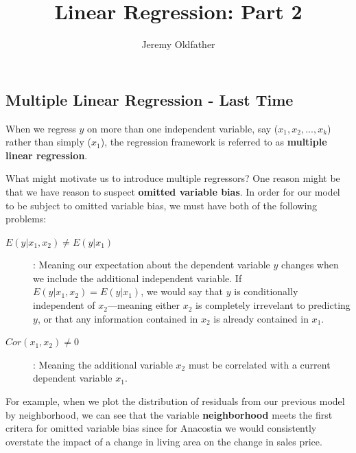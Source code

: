 \documentclass[10pt]{article}\usepackage[]{graphicx}\usepackage[]{color}
\begin{document}
\title{Linear Regression: Part 2}
\author{Jeremy Oldfather}
\maketitle







\subsection*{Multiple Linear Regression - Last Time }

When we regress $y$ on more than one independent variable, say ($x_1, x_2,...,x_k$) rather than simply ($x_1$), the regression framework is referred to as {\bf multiple linear regression}.

What might motivate us to introduce multiple regressors? One reason might be that we have reason to suspect {\bf omitted variable bias}. In order for our model to be subject to omitted variable bias, we must have both of the following problems:

\begin{description}
  \item [$E(y|x_1,x_2) \ne E(y|x_1) $] :  Meaning our expectation about the dependent variable $y$ changes when we include the additional independent variable. If $E(y|x_1,x_2) = E(y|x_1)$, we would say that $y$ is conditionally independent of $x_2$---meaning either $x_2$ is completely irrevelant to predicting $y$, or that any information contained in $x_2$ is already contained in $x_1$.
  \item [$Cor(x_1, x_2) \ne 0 $] :  Meaning the additional variable $x_2$ must be correlated with a current dependent variable $x_1$.
\end{description}

For example, when we plot the distribution of residuals from our previous model by neighborhood, we can see that the variable {\bf neighborhood} meets the first critera for omitted variable bias since for Anacostia we would consistently overstate the impact of a change in living area on the change in sales price.
\end{document}
